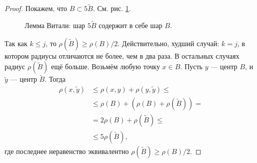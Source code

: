 \begin{proof}
Покажем, что $B \subset 5\tilde B$. См. рис. \ref{fig:vitali-lemma-intersecting-balls}.

\begin{figure}[ht]
    \centering
    \caption{Лемма Витали: шар $5 \tilde B$ содержит в себе шар $B$.}
    \label{fig:vitali-lemma-intersecting-balls}
\end{figure}

Так как $k \leqslant j$, то $\rho(\tilde B) \geqslant \rho(B)/2$. Действительно, худший случай: $k = j$, в котором радиусы отличаются не более, чем в два раза. В остальных случаях радиус $\rho(\tilde B)$ ещё больше. Возьмём любую точку $x \in B$. Пусть $y$ --- центр $B$, и $\tilde y$ --- центр $\tilde B$. Тогда \begin{align*}
 \rho(x, \tilde y) &\leqslant \rho(x, y) + \rho(y, \tilde y) \leqslant \\ & \leqslant \rho(B) + (\rho(B) + \rho(\tilde B)) = \\ &= 2\rho(B) + \rho(\tilde B) \leqslant \\ &\leqslant 5 \rho(\tilde B)
,\end{align*} где последнее неравенство эквивалентно $\rho(\tilde B) \geqslant \rho(B) / 2$.

\end{proof}


